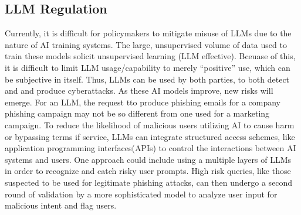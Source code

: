 \documentclass[10pt,twocolumn]{article}
\begin{document}
\subsection{LLM Regulation}
Currently, it is difficult for policymakers to mitigate misuse of LLMs due to the nature of AI training systems. The large, unsupervised volume of data used to train these models solicit unsupervised learning (LLM effective). Bceuase of this, it is difficult to limit LLM usage/capability to merely “positive” use, which can be subjective in itself. Thus, LLMs can be used by both parties, to both detect and and produce cyberattacks. As these AI models improve, new risks will emerge. For an LLM, the request tto produce phishing emails for a company phishing campaign may not be so different from one used for a marketing campaign. To reduce the likelihood of malicious users utilizing AI to cause harm or bypassing terms if service, LLMs can integrate structured access schemes, like application programming interfaces(APIs) to control the interactions between AI systems and users. One approach could include using a multiple layers of LLMs in order to recognize and catch risky user prompts. High risk queries, like those suspected to be used for legitimate phishing attacks, can then undergo a second round of validation by a more sophisticated model to analyze user input for malicious intent and flag users.\cite{llm_vs_human} 
\end{document}
